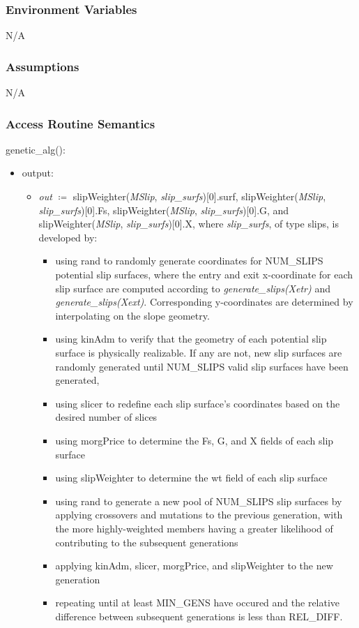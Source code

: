 \documentclass[12pt, titlepage]{article}
\begin{document}
\subsubsection{Environment Variables}
N/A

\subsubsection{Assumptions}
N/A

\subsubsection{Access Routine Semantics}
genetic\_alg():
\begin{itemize}
	\item output:
	\begin{itemize}
	\item[] \textit{out} $\coloneqq$ slipWeighter(\textit{MSlip}, 
	\textit{slip\_surfs})[0].surf, slipWeighter(\textit{MSlip}, 
	\textit{slip\_surfs})[0].Fs, slipWeighter(\textit{MSlip}, 
	\textit{slip\_surfs})[0].G, and slipWeighter(\textit{MSlip}, 
	\textit{slip\_surfs})[0].X, where \textit{slip\_surfs}, of type slips, is 
	developed by:
	\begin{itemize}
		\item using rand to randomly generate coordinates for NUM\_SLIPS 
		potential slip surfaces, where the entry and exit x-coordinate for each 
		slip surface are computed according to \textit{generate\_slips(Xetr)} 
		and \textit{generate\_slips(Xext)}. Corresponding y-coordinates are 
		determined by interpolating on the slope geometry.
		\item using kinAdm to verify that the geometry of each potential slip 
		surface is physically realizable. If any are not, new slip surfaces are 
		randomly generated until NUM\_SLIPS valid slip surfaces have been 
		generated,
		\item using slicer to redefine each slip surface's coordinates based on 
		the desired number of slices
		\item using morgPrice to determine the Fs, G, and X fields of each slip 
		surface
		\item using slipWeighter to determine the wt field of each slip surface
		\item using rand to generate a new pool of NUM\_SLIPS slip surfaces by 
		applying crossovers and mutations to the previous generation, with the 
		more highly-weighted members having a greater likelihood of 
		contributing to the subsequent generations
		\item applying kinAdm, slicer, morgPrice, and slipWeighter to the new 
		generation
		\item repeating until at least MIN\_GENS have occured and the relative 
		difference between subsequent generations is less than REL\_DIFF.
	\end{itemize}
	\end{itemize}
\end{itemize}
\end{document}

